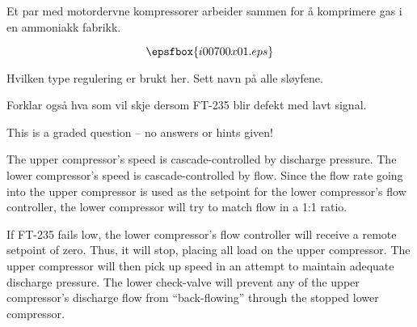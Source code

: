 
Et par med motordervne kompressorer arbeider sammen for {\aa} komprimere gas i en ammoniakk fabrikk.

$$\epsfbox{i00700x01.eps}$$

Hvilken type regulering er brukt her. Sett navn p{\aa} alle sløyfene. 

\vskip 80pt


Forklar ogs{\aa} hva som vil skje dersom FT-235 blir defekt med lavt signal. 


\vfil 

\eject






This is a graded question -- no answers or hints given!







The upper compressor's speed is cascade-controlled by discharge pressure.  The lower compressor's speed is cascade-controlled by flow.  Since the flow rate going into the upper compressor is used as the setpoint for the lower compressor's flow controller, the lower compressor will try to match flow in a 1:1 ratio.

\vskip 10pt

If FT-235 fails low, the lower compressor's flow controller will receive a remote setpoint of zero.  Thus, it will stop, placing all load on the upper compressor.  The upper compressor will then pick up speed in an attempt to maintain adequate discharge pressure.  The lower check-valve will prevent any of the upper compressor's discharge flow from ``back-flowing'' through the stopped lower compressor.



